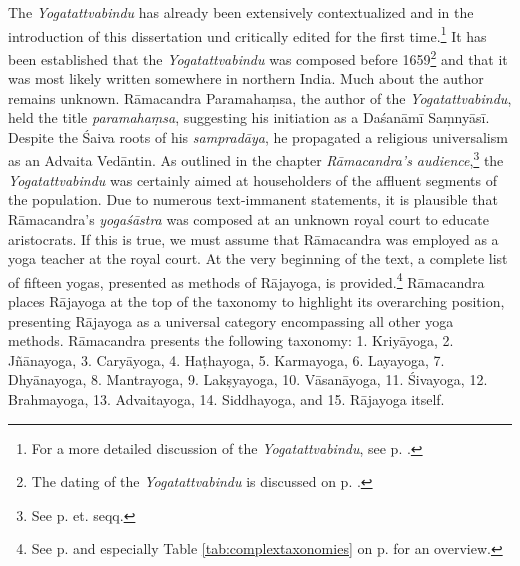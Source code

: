 The \emph{Yogatattvabindu} has already been extensively contextualized and in the introduction of this dissertation und critically edited for the first time.\footnote{For a more detailed discussion of the \emph{Yogatattvabindu}, see p. \pageref{generalremarks}.} It has been established that the \emph{Yogatattvabindu} was composed before 1659\footnote{The dating of the \emph{Yogatattvabindu} is discussed on p. \pageref{dating}.} and that it was most likely written somewhere in northern India. Much about the author remains unknown. Rāmacandra Paramahaṃsa, the author of the \emph{Yogatattvabindu}, held the title \textit{paramahaṃsa}, suggesting his initiation as a Daśanāmī Saṃnyāsī. Despite the Śaiva roots of his \textit{sampradāya}, he propagated a religious universalism as an Advaita Vedāntin. As outlined in the chapter \textit{Rāmacandra's audience},\footnote{See p. \pageref{ytb-audience} et. seqq.} the \emph{Yogatattvabindu} was certainly aimed at householders of the affluent segments of the population. Due to numerous text-immanent statements, it is plausible that Rāmacandra's \textit{yogaśāstra} was composed at an unknown royal court to educate aristocrats. If this is true, we must assume that Rāmacandra was employed as a yoga teacher at the royal court. At the very beginning of the text, a complete list of fifteen yogas, presented as methods of Rājayoga, is provided.\footnote{See p. \pageref{intro} and especially Table \ref{tab:complextaxonomies} on p. \pageref{tab:complextaxonomies} for an overview.} Rāmacandra places Rājayoga at the top of the taxonomy to highlight its overarching position, presenting Rājayoga as a universal category encompassing all other yoga methods. Rāmacandra presents the following taxonomy: 1. Kriyāyoga, 2. Jñānayoga, 3. Caryāyoga, 4. Haṭhayoga, 5. Karmayoga, 6. Layayoga, 7. Dhyānayoga, 8. Mantrayoga, 9. Lakṣyayoga, 10. Vāsanāyoga, 11. Śivayoga, 12. Brahmayoga, 13. Advaitayoga, 14. Siddhayoga, and 15. Rājayoga itself.    

